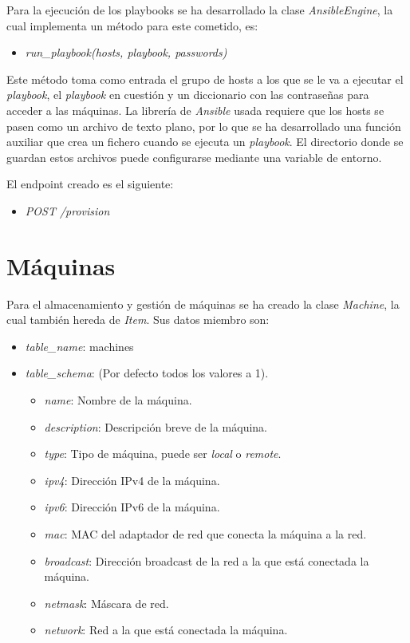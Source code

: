 \bigskip
Para la ejecución de los playbooks se ha desarrollado la clase \textit{AnsibleEngine}, la cual implementa un método para este cometido, es:
\begin{itemize}
	\item \textit{run\_playbook(hosts, playbook, passwords)}
\end{itemize}

\bigskip
Este método toma como entrada el grupo de hosts a los que se le va a ejecutar el \textit{playbook}, el \textit{playbook} en cuestión y un diccionario con las contraseñas para acceder a las máquinas. La librería de \textit{Ansible} usada requiere que los hosts se pasen como un archivo de texto plano, por lo que se ha desarrollado una función auxiliar que crea un fichero cuando se ejecuta un \textit{playbook}. El directorio donde se guardan estos archivos puede configurarse mediante una variable de entorno.



\bigskip
El endpoint creado es el siguiente:
\begin{itemize}
	\item \textit{POST /provision}
\end{itemize}




\section{Máquinas}

Para el almacenamiento y gestión de máquinas se ha creado la clase \textit{Machine}, la cual también hereda de \textit{Item}. Sus datos miembro son:
\begin{itemize}
	\item \textit{table\_name}: machines
	\item \textit{table\_schema}: (Por defecto todos los valores a 1).
	\begin{itemize}
		\item \textit{name}: Nombre de la máquina.
		\item \textit{description}: Descripción breve de la máquina.
		\item \textit{type}: Tipo de máquina, puede ser \textit{local} o \textit{remote}.
		\item \textit{ipv4}: Dirección IPv4 de la máquina.
		\item \textit{ipv6}: Dirección IPv6 de la máquina.
		\item \textit{mac}: MAC del adaptador de red que conecta la máquina a la red.
		\item \textit{broadcast}: Dirección broadcast de la red a la que está conectada la máquina.
		\item \textit{netmask}: Máscara de red.
		\item \textit{network}: Red a la que está conectada la máquina.
	\end{itemize}
\end{itemize}


